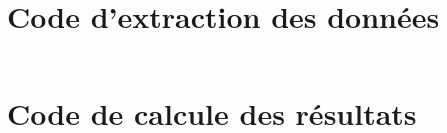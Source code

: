 \chapter{Code d'extraction des données}

\inputminted[fontsize=\footnotesize,linenos,breaklines]{java}{experiment/data_collection/Experiment.java}

\chapter{Code de calcule des résultats}
